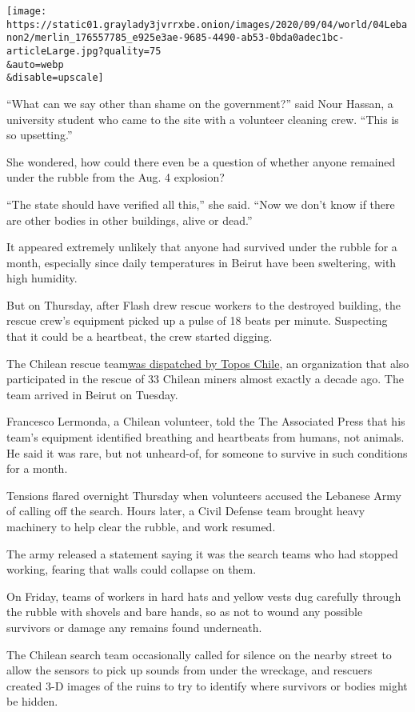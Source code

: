 \texttt{[image: https://static01.graylady3jvrrxbe.onion/images/2020/09/04/world/04Lebanon2/merlin\_176557785\_e925e3ae-9685-4490-ab53-0bda0adec1bc-articleLarge.jpg?quality=75\\\&auto=webp\\\&disable=upscale]}

``What can we say other than shame on the government?'' said Nour
Hassan, a university student who came to the site with a volunteer
cleaning crew. ``This is so upsetting.''

She wondered, how could there even be a question of whether anyone
remained under the rubble from the Aug. 4 explosion?

``The state should have verified all this,'' she said. ``Now we don't
know if there are other bodies in other buildings, alive or dead.''

It appeared extremely unlikely that anyone had survived under the rubble
for a month, especially since daily temperatures in Beirut have been
sweltering, with high humidity.

But on Thursday, after Flash drew rescue workers to the destroyed
building, the rescue crew's equipment picked up a pulse of 18 beats per
minute. Suspecting that it could be a heartbeat, the crew started
digging.

The Chilean rescue
team\href{https://www.chicureohoy.cl/actualidad/topos-chile-los-socorristas-que-buscan-al-posible-sobreviviente-en-beirut/}{was
dispatched by Topos Chile}, an organization that also participated in
the rescue of 33 Chilean miners almost exactly a decade ago. The team
arrived in Beirut on Tuesday.

Francesco Lermonda, a Chilean volunteer, told the The Associated Press
that his team's equipment identified breathing and heartbeats from
humans, not animals. He said it was rare, but not unheard-of, for
someone to survive in such conditions for a month.

Tensions flared overnight Thursday when volunteers accused the Lebanese
Army of calling off the search. Hours later, a Civil Defense team
brought heavy machinery to help clear the rubble, and work resumed.

The army released a statement saying it was the search teams who had
stopped working, fearing that walls could collapse on them.

On Friday, teams of workers in hard hats and yellow vests dug carefully
through the rubble with shovels and bare hands, so as not to wound any
possible survivors or damage any remains found underneath.

The Chilean search team occasionally called for silence on the nearby
street to allow the sensors to pick up sounds from under the wreckage,
and rescuers created 3-D images of the ruins to try to identify where
survivors or bodies might be hidden.

